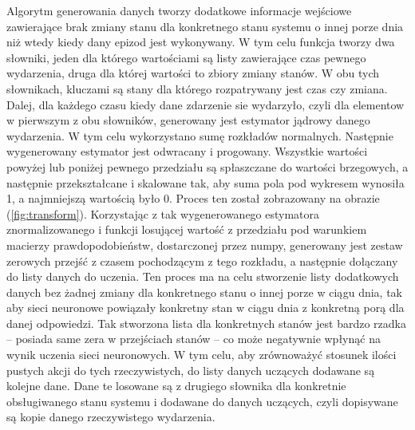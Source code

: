 Algorytm generowania danych tworzy dodatkowe informacje wejściowe zawierające brak zmiany stanu dla konkretnego stanu systemu o innej porze dnia niż wtedy kiedy dany epizod jest wykonywany. W tym celu funkcja tworzy dwa słowniki, jeden dla którego wartościami są listy zawierające czas pewnego wydarzenia, druga dla której wartości to zbiory zmiany stanów. W obu tych słownikach, kluczami są stany dla którego rozpatrywany jest czas czy zmiana. Dalej, dla każdego czasu kiedy dane zdarzenie sie wydarzyło, czyli dla elementow w pierwszym z obu słowników, generowany jest estymator jądrowy danego wydarzenia. W tym celu wykorzystano sumę rozkładów normalnych. Następnie wygenerowany estymator jest odwracany i progowany. Wszystkie wartości powyżej lub poniżej pewnego przedziału są spłaszczane do wartości brzegowych, a następnie przekształcane i skalowane tak, aby suma pola pod wykresem wynosiła 1, a najmniejszą wartością było 0. Proces ten został zobrazowany na obrazie (\ref{fig:transform}). Korzystając z tak wygenerowanego estymatora znormalizowanego i funkcji losującej wartość z przedziału pod warunkiem macierzy prawdopodobieństw, dostarczonej przez numpy, generowany jest zestaw zerowych przejść z czasem pochodzącym z tego rozkładu, a następnie dołączany do listy danych do uczenia. Ten proces ma na celu stworzenie listy dodatkowych danych bez żadnej zmiany dla konkretnego stanu o innej porze w ciągu dnia, tak aby sieci neuronowe powiązały konkretny stan w ciągu dnia z konkretną porą dla danej odpowiedzi. Tak stworzona lista dla konkretnych stanów jest bardzo rzadka -- posiada same zera w przejściach stanów -- co może negatywnie wpłynąć na wynik uczenia sieci neuronowych. W tym celu, aby zrównoważyć stosunek ilości pustych akcji do tych rzeczywistych, do listy danych uczących dodawane są kolejne dane. Dane te losowane są z drugiego słownika dla konkretnie obsługiwanego stanu systemu i dodawane do danych uczących, czyli dopisywane są kopie danego rzeczywistego wydarzenia.

